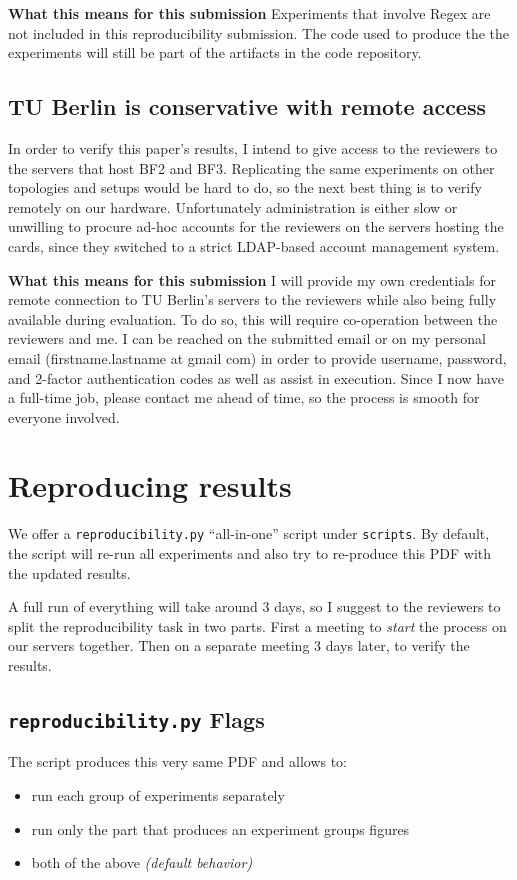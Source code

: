 \documentclass[sigconf, nonacm]{acmart}
\begin{document}
\textbf{What this means for this submission}
Experiments that involve Regex are not included in this reproducibility
submission. The code used to produce the the experiments will still be part of the
artifacts in the code repository.

\subsection{TU Berlin is conservative with remote access}
In order to verify this paper's results, I intend to give access
to the reviewers to the servers that host BF2 and BF3. Replicating
the same experiments on other topologies and setups would be hard to do,
so the next best thing is to verify remotely on our hardware.
Unfortunately administration is either slow or unwilling to
procure ad-hoc accounts for the reviewers on the servers hosting the cards,
since they switched to a strict LDAP-based account management system.

\textbf{What this means for this submission}
I will provide my own credentials for remote connection to TU Berlin's servers
to the reviewers while also being fully available during evaluation.
To do so, this will require co-operation between the reviewers and me. I can be
reached on the submitted email or on my personal email (firstname.lastname at gmail com)
in order to provide username, password, and 2-factor authentication codes
as well as assist in execution. Since I now have a full-time job,
please contact me ahead of time, so the process is smooth for everyone involved.

\section{Reproducing results}
We offer a \texttt{reproducibility.py} ``all-in-one'' script under \texttt{scripts}.
By default, the script will re-run all experiments and also try to re-produce this
PDF with the updated results.

A full run of everything will take around 3 days, so I suggest to the reviewers
to split the reproducibility task in two parts. First a meeting to \textit{start}
the process on our servers together. Then on a separate meeting 3 days 
later, to verify the results.

\subsection{\texttt{reproducibility.py} Flags}
The script produces this very same PDF and allows to:
\begin{itemize}
    \item run each group of experiments separately
    \item run only the part that produces an experiment groups figures
    \item both of the above \textit{(default behavior)}
\end{itemize}
\end{document}

